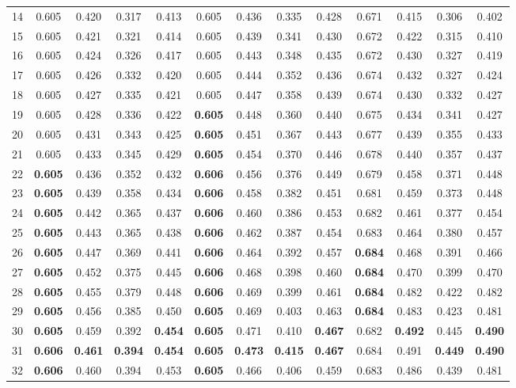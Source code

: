 \documentclass[11pt,a4paper]{article}
\begin{document}
\begin{landscape}
\begin{table}[p]
\begin{tabular}{rcccccccccccc}
14 & 0.605 & 0.420 & 0.317 & 0.413 & 0.605 & 0.436 & 0.335 & 0.428 & 0.671 & 0.415 & 0.306 & 0.402 \\
15 & 0.605 & 0.421 & 0.321 & 0.414 & 0.605 & 0.439 & 0.341 & 0.430 & 0.672 & 0.422 & 0.315 & 0.410 \\
\midrule
16 & 0.605 & 0.424 & 0.326 & 0.417 & 0.605 & 0.443 & 0.348 & 0.435 & 0.672 & 0.430 & 0.327 & 0.419 \\
17 & 0.605 & 0.426 & 0.332 & 0.420 & 0.605 & 0.444 & 0.352 & 0.436 & 0.674 & 0.432 & 0.327 & 0.424 \\
18 & 0.605 & 0.427 & 0.335 & 0.421 & 0.605 & 0.447 & 0.358 & 0.439 & 0.674 & 0.430 & 0.332 & 0.427 \\
19 & 0.605 & 0.428 & 0.336 & 0.422 & \textbf{0.605} & 0.448 & 0.360 & 0.440 & 0.675 & 0.434 & 0.341 & 0.427 \\
20 & 0.605 & 0.431 & 0.343 & 0.425 & \textbf{0.605} & 0.451 & 0.367 & 0.443 & 0.677 & 0.439 & 0.355 & 0.433 \\
21 & 0.605 & 0.433 & 0.345 & 0.429 & \textbf{0.605} & 0.454 & 0.370 & 0.446 & 0.678 & 0.440 & 0.357 & 0.437 \\
22 & \textbf{0.605} & 0.436 & 0.352 & 0.432 & \textbf{0.606} & 0.456 & 0.376 & 0.449 & 0.679 & 0.458 & 0.371 & 0.448 \\
23 & \textbf{0.605} & 0.439 & 0.358 & 0.434 & \textbf{0.606} & 0.458 & 0.382 & 0.451 & 0.681 & 0.459 & 0.373 & 0.448 \\
\midrule
24 & \textbf{0.605} & 0.442 & 0.365 & 0.437 & \textbf{0.606} & 0.460 & 0.386 & 0.453 & 0.682 & 0.461 & 0.377 & 0.454 \\
25 & \textbf{0.605} & 0.443 & 0.365 & 0.438 & \textbf{0.606} & 0.462 & 0.387 & 0.454 & 0.683 & 0.464 & 0.380 & 0.457 \\
26 & \textbf{0.605} & 0.447 & 0.369 & 0.441 & \textbf{0.606} & 0.464 & 0.392 & 0.457 & \textbf{0.684} & 0.468 & 0.391 & 0.466 \\
27 & \textbf{0.605} & 0.452 & 0.375 & 0.445 & \textbf{0.606} & 0.468 & 0.398 & 0.460 & \textbf{0.684} & 0.470 & 0.399 & 0.470 \\
28 & \textbf{0.605} & 0.455 & 0.379 & 0.448 & \textbf{0.606} & 0.469 & 0.399 & 0.461 & \textbf{0.684} & 0.482 & 0.422 & 0.482 \\
29 & \textbf{0.605} & 0.456 & 0.385 & 0.450 & \textbf{0.605} & 0.469 & 0.403 & 0.463 & \textbf{0.684} & 0.483 & 0.423 & 0.481 \\
30 & \textbf{0.605} & 0.459 & 0.392 & \textbf{0.454} & \textbf{0.605} & 0.471 & 0.410 & \textbf{0.467} & 0.682 & \textbf{0.492} & 0.445 & \textbf{0.490} \\
31 & \textbf{0.606} & \textbf{0.461} & \textbf{0.394} & \textbf{0.454} & \textbf{0.605} & \textbf{0.473} & \textbf{0.415} & \textbf{0.467} & 0.684 & 0.491 & \textbf{0.449} & \textbf{0.490} \\
32 & \textbf{0.606} & 0.460 & 0.394 & 0.453 & \textbf{0.605} & 0.466 & 0.406 & 0.459 & 0.683 & 0.486 & 0.439 & 0.481 \\
\bottomrule
\end{tabular}\end{table}\end{landscape}
\end{document}
